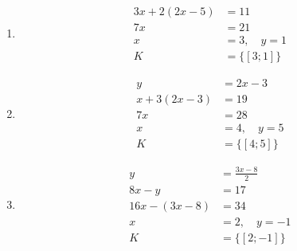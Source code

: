 \documentclass[11pt,a4paper]{article}
\begin{document}
\begin{zadaniReseniBox}[title={Domácí úkol}]
\begin{enumerate}[label=\alph*)]
\[\]
\item
\[
\begin{aligned}
3x+2(2x-5)&=11\\7x&=21\\x&=3,\quad y=1 \\[2mm]
K &= \{[3;1]\}
\end{aligned}
\]
\item
\[
\begin{aligned}
y&=2x-3\\x+3(2x-3)&=19\\7x&=28\\x&=4,\quad y=5 \\[2mm]
K &= \{[4;5]\}
\end{aligned}
\]
\item
\[
\begin{aligned}
y&=\frac{3x-8}{2}\\8x-y&=17\\16x-(3x-8)&=34\\x&=2,\quad y=-1 \\[2mm]
K &= \{[2;-1]\}
\end{aligned}
\]
\end{enumerate}
\end{zadaniReseniBox}
\end{document}
